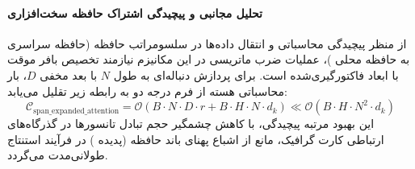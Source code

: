 \paragraph{تحلیل مجانبی و پیچیدگی اشتراک حافظه سخت‌افزاری}
از منظر پیچیدگی محاسباتی و انتقال داده‌ها در سلسومراتب حافظه (حافظه سراسری  به حافظه محلی )، عملیات ضرب ماتریسی در این مکانیزم نیازمند تخصیص بافر موقت با ابعاد فاکتورگیری‌شده است. برای پردازش دنباله‌ای به طول $N$ با بعد مخفی $D$، بار محاسباتی هسته از فرم درجه دو به رابطه زیر تقلیل می‌یابد:
\begin{equation}
\label{eq:complexity_span_expanded_attention}
\mathcal{C}_{\text{span\_expanded\_attention}} = \mathcal{O}\left( B \cdot N \cdot D \cdot r + B \cdot H \cdot N \cdot d_k \right) \ll \mathcal{O}\left( B \cdot H \cdot N^2 \cdot d_k \right)
\end{equation}
این بهبود مرتبه پیچیدگی، با کاهش چشمگیر حجم تبادل تانسورها در گذرگاه‌های ارتباطی کارت گرافیک، مانع از اشباع پهنای باند حافظه (پدیده ) در فرآیند استنتاج طولانی‌مدت می‌گردد.
